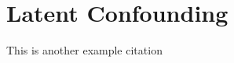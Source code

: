 \section{Latent Confounding}

\blindtext[2]

This is another example citation \cite{wang_2019_blessings}
